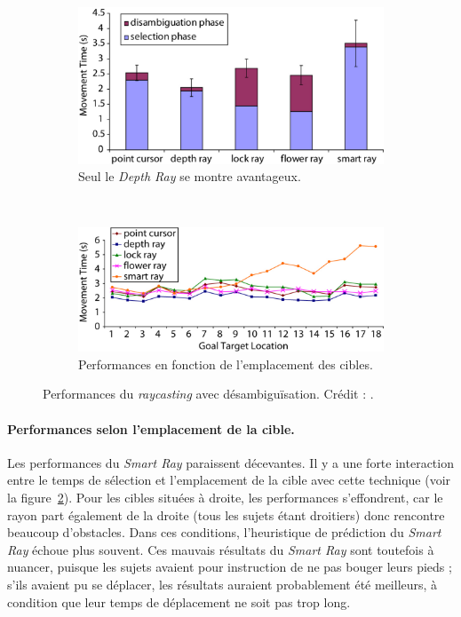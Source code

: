 	\begin{figure}[!htbp]
		\begin{subfigure}[t]{0.42\textwidth}
			\centering
			\includegraphics[width=\textwidth]{figures/ch2/rayTimes}
			\caption{Seul le \emph{Depth Ray} se montre avantageux.}
			\label{fig:rayTimes}
		\end{subfigure}
		~
		\begin{subfigure}[t]{0.56\textwidth}
			\centering
			\includegraphics[width=\textwidth]{figures/ch2/smartRayLocation}
			\caption{Performances en fonction de l'emplacement des cibles.}
			\label{fig:smartRayLocation}
		\end{subfigure}
		\caption[Performances du \emph{raycasting} avec désambiguïsation]{Performances du \emph{raycasting} avec désambiguïsation. Crédit : \cite{grossman2006design}.}
		\label{fig:rayPerf}
	\end{figure}

	\paragraph{Performances selon l'emplacement de la cible.}
	Les performances du \emph{Smart Ray} paraissent décevantes. Il y a une forte interaction entre le temps de sélection et l'emplacement de la cible avec cette technique (voir la figure~\ref{fig:smartRayLocation}). Pour les cibles situées à droite, les performances s'effondrent, car le rayon part également de la droite (tous les sujets étant droitiers) donc rencontre beaucoup d'obstacles. Dans ces conditions, l'heuristique de prédiction du \emph{Smart Ray} échoue plus souvent. Ces mauvais résultats du \emph{Smart Ray} sont toutefois à nuancer, puisque les sujets avaient pour instruction de ne pas bouger leurs pieds ; s'ils avaient pu se déplacer, les résultats auraient probablement été meilleurs, à condition que leur temps de déplacement ne soit pas trop long.
	
